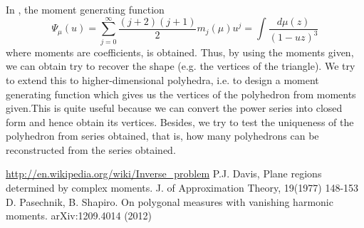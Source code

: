 \documentclass[twocolumn]{article}
\begin{document}
\begin{large}
In \cite{PS12}, the moment generating function 
$$\Psi_\mu (u)=\sum_{j=0}^{\infty}{\frac{(j+2)(j+1)}{2}{m_j(\mu)u^j}}=\int \frac{d\mu(z)}{(1-uz)^3}$$
where moments are coefficients, is obtained. Thus, by using the moments
given, we can obtain try to recover the shape (e.g. the vertices of the triangle). 
We try to extend this to higher-dimensional
polyhedra, i.e. to design a moment generating function which gives us
the vertices of the polyhedron from moments given.This is quite useful because
we can convert the power series into closed form and hence obtain its
vertices.  Besides, we try to test the uniqueness of the polyhedron from
series obtained, that is, how many polyhedrons can be reconstructed from the
series obtained.

\begin{thebibliography}{10}
 \url{http://en.wikipedia.org/wiki/Inverse_problem}
 P.J. Davis, Plane regions determined by complex moments. 
J. of Approximation Theory, 19(1977) 
148-153
 D. Pasechnik, B. Shapiro. 
On polygonal measures with vanishing harmonic moments. arXiv:1209.4014 (2012)
\end{thebibliography}
\end{large}
\end{document}
